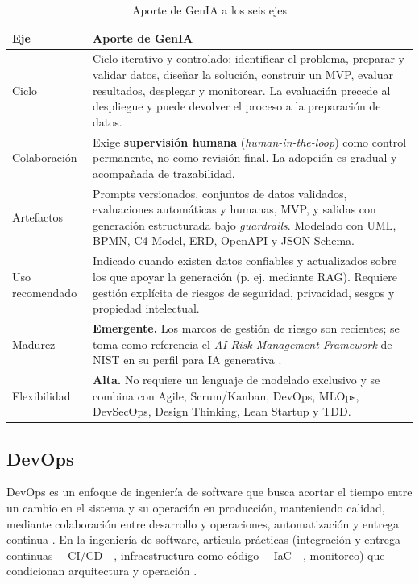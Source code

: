 \documentclass[conference]{IEEEtran}
\begin{document}
\begin{table}[!t]
\centering
\footnotesize
\caption{Aporte de GenIA a los seis ejes}
\begin{tabular}{p{}p{}}
\hline
\textbf{Eje} & \textbf{Aporte de GenIA} \\ \hline
Ciclo & Ciclo iterativo y controlado: identificar el problema, preparar y validar datos, diseñar la solución, construir un MVP, evaluar resultados, desplegar y monitorear. La evaluación precede al despliegue y puede devolver el proceso a la preparación de datos. \\ \hline
Colaboración & Exige \textbf{supervisión humana} (\textit{human-in-the-loop}) como control permanente, no como revisión final. La adopción es gradual y acompañada de trazabilidad. \\ \hline
Artefactos & Prompts versionados, conjuntos de datos validados, evaluaciones automáticas y humanas, MVP, y salidas con generación estructurada bajo \textit{guardrails}. Modelado con UML, BPMN, C4 Model, ERD, OpenAPI y JSON Schema. \\ \hline
Uso recomendado & Indicado cuando existen datos confiables y actualizados sobre los que apoyar la generación (p. ej. mediante RAG). Requiere gestión explícita de riesgos de seguridad, privacidad, sesgos y propiedad intelectual. \\ \hline
Madurez & \textbf{Emergente.} Los marcos de gestión de riesgo son recientes; se toma como referencia el \textit{AI Risk Management Framework} de NIST en su perfil para IA generativa \cite{NISTGenAI}. \\ \hline
Flexibilidad & \textbf{Alta.} No requiere un lenguaje de modelado exclusivo y se combina con Agile, Scrum/Kanban, DevOps, MLOps, DevSecOps, Design Thinking, Lean Startup y TDD. \\ \hline
\end{tabular}
\end{table}

\subsection{DevOps}

DevOps es un enfoque de ingeniería de software que busca acortar el tiempo entre un cambio en el sistema y su operación en producción, manteniendo calidad, mediante colaboración entre desarrollo y operaciones, automatización y entrega continua \cite{Bass2015,Jabbari2016}. En la ingeniería de software, articula prácticas (integración y entrega continuas ---CI/CD---, infraestructura como código ---IaC---, monitoreo) que condicionan arquitectura y operación \cite{Bass2015,Jabbari2016}.
\end{document}
